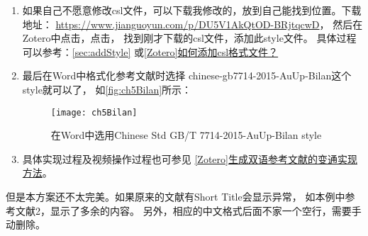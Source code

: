 \documentclass[cn,11pt,chinese]{elegantbook}
\begin{document}
\begin{enumerate}
\begin{lstlisting}
								[3] UDENIGWE C C, WU S, DRUMMOND K, 等. Revisiting the prospects of plastein: thermal and simulated gastric stability in relation to the antioxidative capacity of casein plastein[J]. Journal of Agricultural and Food Chemistry, 2014,62(1):130–135. 
								Revisiting the prospects of plastein.
								
								[4] 张娟娟, 刘尊英, 董士远, 等. 锌离子结合类蛋白反应修饰肽的稳定性研究[J]. 现代食品科技, 2015,31(09):150–154. 
								ZHANG J J,LIU J Y,DONG S Y,et al. Stability of modified peptide using zinc binding and plastein reaction [J]. Modern Food Science and Technology, 2015, 31(09): 150–154.
								
								[5] 朱磊, 张馨心, 谢艳英, 等. 类蛋白反应的作用机制及其对海洋源蛋白修饰的研究进展[J]. 食品工业科技, 2020,41(09):362–367. 
								ZHU L,ZHANG X X,XIE Y Y,et al. Research progress on mechanism of plastein reactions and its modification function of marine proteins [J]. Science and Technology of Food Industry, 2020, 41(09): 362–367.
							\end{lstlisting}
						\item 如果自己不愿意修改csl文件，可以下载我修改的，放到自己能找到位置。下载地址：
							\url{https://www.jianguoyun.com/p/DU5V1AkQtOD-BRjtqcwD}，
							然后在Zotero中点击，点击\menu{+}，
							找到刚才下载的csl文件，添加此style文件。
							具体过程可以参考：\cref{sec:addStyle}
							或\href{https://zhuanlan.zhihu.com/p/64624484}{[Zotero]如何添加csl格式文件？}
						\item 	
							最后在Word中格式化参考文献时选择
							chinese-gb7714-2015-AuUp-Bilan这个style就可以了，
							如\autoref{fig:ch5Bilan}所示：
								\begin{figure}[ht]
									\centering
									\texttt{[image: ch5Bilan]}
									\caption{在Word中选用Chinese Std GB/T 7714-2015-AuUp-Bilan style}
									\label{fig:ch5Bilan}
								\end{figure}
	
						\item 	具体实现过程及视频操作过程也可参见
							\href{https://zhuanlan.zhihu.com/p/282826403}
							{[Zotero]生成双语参考文献的变通实现方法}。
				\end{enumerate}

				 
				但是本方案还不太完美。如果原来的文献有Short Title会显示异常，
				如本例中参考文献2，显示了多余的内容。
				另外，相应的中文格式后面不家一个空行，需要手动删除。
\end{document}
